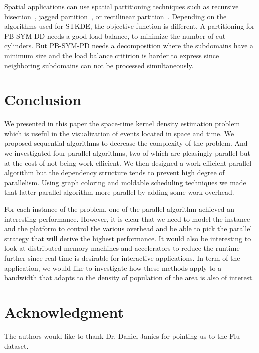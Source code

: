 \documentclass[10pt, conference, compsocconf]{IEEEtran}
\begin{document}
Spatial applications can use spatial partitioning techniques 
such as recursive bisection~\cite{berger87}, jagged partition~\cite{ujaldon96,pinar97,DeveciRDC16}, or
rectilinear partition~\cite{nicol94,manne96}. Depending on the algorithms used for
STKDE, the objective function is different. A partitioning for
PB-SYM-DD needs a good load balance, to minimize the number of cut
cylinders. But PB-SYM-PD
needs a decomposition where the subdomains have a minimum size and the load balance critirion is harder to express since
neighboring subdomains can not be processed simultaneously.

\section{Conclusion}

We presented in this paper the space-time kernel density estimation
problem which is useful in the visualization of events located in
space and time. We proposed sequential algorithms to decrease the
complexity of the problem. And we investigated four parallel
algorithms, two of which are pleasingly parallel but at the cost of
not being work efficient. We then designed a work-efficient parallel
algorithm but the dependency structure tends to prevent high degree of
parallelism. Using graph coloring and moldable scheduling techniques
we made that latter parallel algorithm more parallel by adding some
work-overhead.

For each instance of the problem, one of the parallel algorithm
achieved an interesting performance. However, it is clear that we need
to model the instance and the platform to control the various overhead
and be able to pick the parallel strategy that will derive the highest
performance. It would also be interesting to look at distributed
memory machines and accelerators to reduce the runtime further since
real-time is desirable for interactive applications. In term of the
application, we would like to investigate how these methods apply to a
bandwidth that adapts to the density of population of the area is also
of interest.

\section*{Acknowledgment}

The authors would like to thank Dr. Daniel Janies for pointing us to
the Flu dataset.




\end{document}
